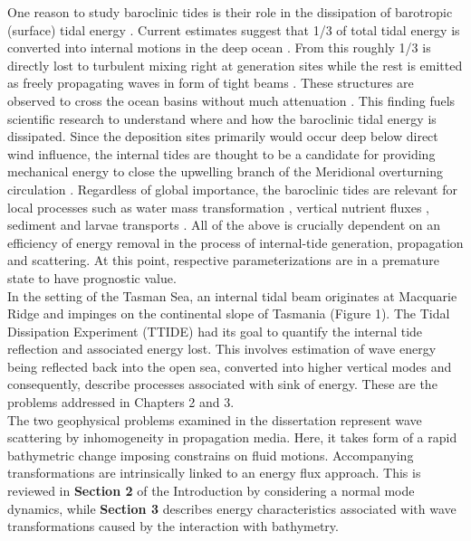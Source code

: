 \documentclass[12pt]{article}
\begin{document}
One reason to study baroclinic tides is their role in the dissipation of barotropic (surface) tidal 
energy \citep{munk1997once}. Current estimates suggest that 1/3 of total tidal energy is 
converted into internal motions in the deep ocean \citep{egbert2000significant}. From this roughly 
1/3 is directly lost to turbulent mixing right at generation sites \citep{st2002role} while the 
rest is emitted as freely propagating waves in form of tight beams \citep{simmons2004tidally}. 
These structures are observed to cross the ocean basins without much attenuation 
\citep{zhao2016global}. This finding fuels scientific research to understand where and how the 
baroclinic tidal energy is dissipated. Since the deposition sites primarily would occur deep below 
direct wind influence, the internal tides are thought to be a candidate for providing mechanical 
energy to close the upwelling branch of the Meridional overturning circulation 
\citep{munk1998abyssal}. Regardless of global importance, the baroclinic tides are relevant for 
local processes such as water mass transformation \citep{stigebrandt1989vertical}, vertical 
nutrient fluxes \citep{sharples2007spring}, sediment \citep{hotchkiss1982internal} and larvae 
transports \citep{pineda1999circulation}. All of the above is crucially dependent on an efficiency 
of energy removal in the process of internal-tide generation, propagation and scattering. 
At this point, respective parameterizations are in a premature state to have prognostic value.\\
In the setting of the Tasman Sea, an internal tidal beam originates at Macquarie Ridge and impinges 
on the continental slope of Tasmania (Figure 1). The Tidal Dissipation Experiment (TTIDE) had its 
goal to quantify the internal tide reflection and associated energy lost. This involves estimation 
of wave energy being reflected back into the open sea, converted into higher vertical modes and 
consequently, describe processes associated with sink of energy. These are the problems addressed 
in Chapters 2 and 3.\\
The two geophysical problems examined in the dissertation represent wave scattering by 
inhomogeneity in propagation media. Here, it takes form of a rapid bathymetric change
imposing constrains on fluid motions. Accompanying transformations are intrinsically linked to 
an energy flux approach. This is reviewed in \textbf{Section 2} of the Introduction by considering 
a normal mode dynamics, while \textbf{Section 3} describes energy characteristics associated with 
wave transformations caused by the interaction with bathymetry.\\
\end{document}
